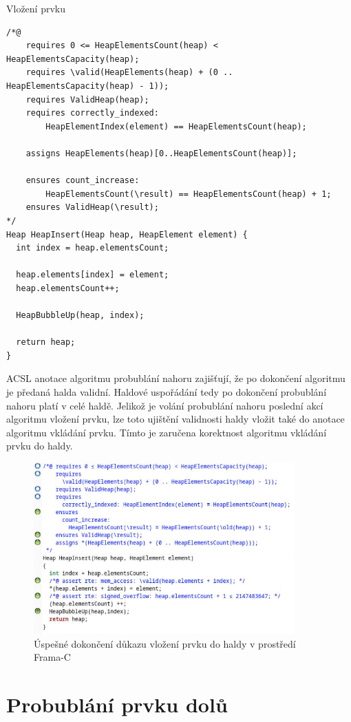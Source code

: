\begin{listing}[H]
	\caption{Vložení prvku}
	\label{list:HeapInsert}
	\begin{verbatim}
/*@
    requires 0 <= HeapElementsCount(heap) < HeapElementsCapacity(heap);
    requires \valid(HeapElements(heap) + (0 .. HeapElementsCapacity(heap) - 1));
    requires ValidHeap(heap);
    requires correctly_indexed:
    	HeapElementIndex(element) == HeapElementsCount(heap);

    assigns HeapElements(heap)[0..HeapElementsCount(heap)];
    
    ensures count_increase: 
    	HeapElementsCount(\result) == HeapElementsCount(heap) + 1;
    ensures ValidHeap(\result);
*/
Heap HeapInsert(Heap heap, HeapElement element) {
  int index = heap.elementsCount;

  heap.elements[index] = element;
  heap.elementsCount++;

  HeapBubbleUp(heap, index);

  return heap;
}
	\end{verbatim}
\end{listing}

ACSL anotace algoritmu probublání nahoru zajišťují, že po dokončení algoritmu je předaná halda validní. Haldové uspořádání tedy po dokončení probublání nahoru platí v celé haldě. Jelikož je volání probublání nahoru poslední akcí algoritmu vložení prvku, lze toto ujištění validnosti haldy vložit také do anotace algoritmu vkládání prvku. Tímto je zaručena korektnost algoritmu vkládání prvku do haldy.

\begin{figure}[H]
	\centering
	\includegraphics[width=10cm]{images/frama-c-HeapInsert}
	\caption{Úspešné dokončení důkazu vložení prvku do haldy v prostředí Frama-C}
	\label{img:F-C-HeapInsert}
\end{figure}


\section{Probublání prvku dolů}
\label{subsec:HeapBubbleDown}

